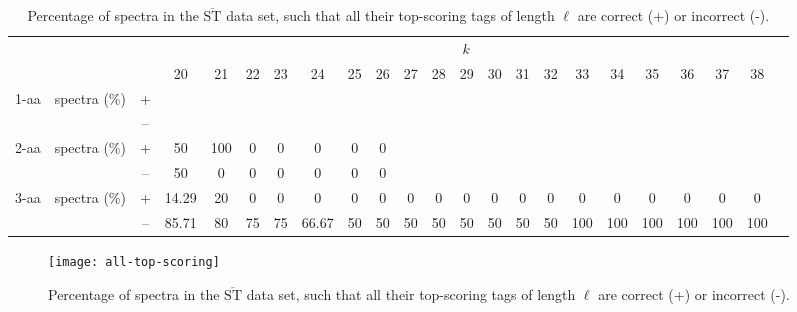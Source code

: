 \documentclass{article}[12pt]
\def\STbar{{\overline{\mathrm{ST}}}}
\begin{document}
\begin{landscape}
\begin{table}[ht]
\vspace{3mm}
\end{table}
\begin{table}[ht]\tiny
\vspace{3mm}
{\centering
\begin{center}
\begin{tabular}{|c|cc|c|c|c|c|c|c|c|c|c|c|c|c|c|c|c|c|c|c|c|c|}
  \hline
  \multicolumn{3}{|c|}{ } & \multicolumn{ 19}{|c|}{$k$} \\
  \cline{4-22 }
  \multicolumn{3}{|c|}{ } 
 & 20 & 21 & 22 & 23 & 24 & 25 & 26 & 27 & 28 & 29 & 30 & 31 & 32 & 33 & 34 & 35 & 36 & 37 & 38\\
\hline
  \multirow{2}{*}{1-aa}& \multirow{2}{*}{spectra (\%)}  &  +
 &  &  &  &  &  &  &  &  &  &  &  &  &  &  &  &  &  &  & \\
 & 
 &  --
 &  &  &  &  &  &  &  &  &  &  &  &  &  &  &  &  &  &  & \\
\hline
  \multirow{2}{*}{2-aa}& \multirow{2}{*}{spectra (\%)}  &  +
 & 50 & 100 & 0 & 0 & 0 & 0 & 0 &  &  &  &  &  &  &  &  &  &  &  & \\
 & 
 &  --
 & 50 & 0 & 0 & 0 & 0 & 0 & 0 &  &  &  &  &  &  &  &  &  &  &  & \\
\hline
  \multirow{2}{*}{3-aa}& \multirow{2}{*}{spectra (\%)}  &  +
 & 14.29 & 20 & 0 & 0 & 0 & 0 & 0 & 0 & 0 & 0 & 0 & 0 & 0 & 0 & 0 & 0 & 0 & 0 & 0\\
 & 
 &  --
 & 85.71 & 80 & 75 & 75 & 66.67 & 50 & 50 & 50 & 50 & 50 & 50 & 50 & 50 & 100 & 100 & 100 & 100 & 100 & 100 \\
  \hline
\end{tabular}
\end{center}
\par}
\centering

\caption{Percentage of spectra in the $\STbar$ data set, such that all their top-scoring tags of length $\ell$ are correct (+) or incorrect (-).}
\label{table:all-top-scoring}

\vspace{3mm}
\end{table}
\end{landscape}

\begin{figure}
  \begin{center}
\texttt{[image: all-top-scoring]}
\end{center}
\caption{Percentage of spectra in the $\STbar$ data set, such that all their top-scoring tags of length $\ell$ are correct (+) or incorrect (-).}
  \label{fig:all-top-scoring}
\end{figure}
\end{document}
